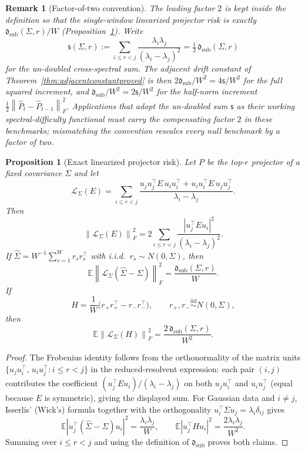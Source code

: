 \documentclass[11pt]{article}
\theoremstyle{tightplain}
\newtheorem{proposition}[theorem]{Proposition}
\theoremstyle{tightdef}
\newtheorem{remark}[theorem]{Remark}
\newcommand{\E}{\mathbb E}
\newcommand{\norm}[1]{\left\lVert #1 \right\rVert}
\newcommand{\abs}[1]{\left\lvert #1 \right\rvert}
\newcommand{\ssum}{\mathsf s}
\begin{document}
\begin{remark}[Factor-of-two convention]\label{rem:convention}
The leading factor $2$ is kept \emph{inside} the definition so that the
single-window linearized projector risk is exactly
$\mathfrak d_{\mathrm{sub}}(\Sigma,r)/W$
(Proposition~\ref{prop:dsub}). Write
\[
\ssum(\Sigma,r):=\sum_{i\le r<j}\frac{\lambda_i\lambda_j}{(\lambda_i-\lambda_j)^2}
=\tfrac12\,\mathfrak d_{\mathrm{sub}}(\Sigma,r)
\]
for the un-doubled cross-spectral sum. The adjacent drift constant of
Theorem~\ref{thm:adjacentconstantproved} is then
$2\mathfrak d_{\mathrm{sub}}/W^2=4\ssum/W^2$ for the full squared increment, and
$\mathfrak d_{\mathrm{sub}}/W^2=2\ssum/W^2$ for the half-norm increment
$\tfrac12\norm{\widehat P_t-\widehat P_{t-1}}_F^2$. Applications that adopt the
un-doubled sum $\ssum$ as their working spectral-difficulty functional must
carry the compensating factor $2$ in these benchmarks; mismatching the
convention rescales every null benchmark by a factor of two.
\end{remark}

\begin{proposition}[Exact linearized projector risk]\label{prop:dsub}
Let $P$ be the top-$r$ projector of a fixed covariance $\Sigma$ and let
\[
\mathcal L_\Sigma(E)=
\sum_{i\le r<j}
\frac{u_j u_j^\top E\, u_i u_i^\top+u_i u_i^\top E\, u_j u_j^\top}{\lambda_i-\lambda_j}.
\]
Then
\[
\norm{\mathcal L_\Sigma(E)}_F^2
=2\sum_{i\le r<j}\frac{\abs{u_j^\top E u_i}^2}{(\lambda_i-\lambda_j)^2}.
\]
If $\widehat\Sigma=W^{-1}\sum_{s=1}^W r_s r_s^\top$ with i.i.d.\
$r_s\sim N(0,\Sigma)$, then
\[
\E\norm{\mathcal L_\Sigma(\widehat\Sigma-\Sigma)}_F^2
=\frac{\mathfrak d_{\mathrm{sub}}(\Sigma,r)}{W}.
\]
If
\[
H=\frac1W\bigl(r_+r_+^\top-r_-r_-^\top\bigr),
\qquad
r_+,r_-\stackrel{\mathrm{iid}}{\sim}N(0,\Sigma),
\]
then
\[
\E\norm{\mathcal L_\Sigma(H)}_F^2
=\frac{2\,\mathfrak d_{\mathrm{sub}}(\Sigma,r)}{W^2}.
\]
\end{proposition}

\begin{proof}
The Frobenius identity follows from the orthonormality of the matrix units
$\{u_j u_i^\top,\,u_i u_j^\top:i\le r<j\}$ in the reduced-resolvent expression:
each pair $(i,j)$ contributes the coefficient $(u_j^\top E u_i)/(\lambda_i-\lambda_j)$
on both $u_j u_i^\top$ and $u_i u_j^\top$ (equal because $E$ is symmetric),
giving the displayed sum. For Gaussian data and $i\ne j$, Isserlis' (Wick's)
formula \cite{Isserlis1918,Janson1997} together with the orthogonality
$u_i^\top\Sigma u_j=\lambda_i\delta_{ij}$ gives
\[
\E\abs{u_j^\top(\widehat\Sigma-\Sigma)u_i}^2
=\frac{\lambda_i\lambda_j}{W},
\qquad
\E\abs{u_j^\top H u_i}^2
=\frac{2\lambda_i\lambda_j}{W^2}.
\]
Summing over $i\le r<j$ and using the definition of
$\mathfrak d_{\mathrm{sub}}$ proves both claims.
\end{proof}
\end{document}

